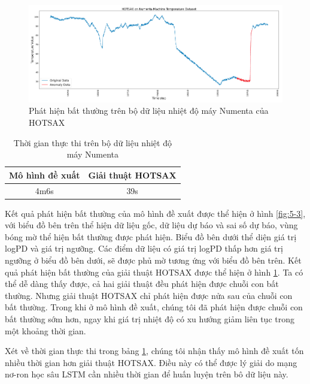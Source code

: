 \begin{figure}[H]
    \centering
    \includegraphics[scale=0.85]{./content/images/5-4.png}
    \caption{Phát hiện bất thường trên bộ dữ liệu nhiệt độ máy Numenta của HOTSAX}
    \label{fig:5-4}
\end{figure}

\begin{table}[H]
\centering
\begin{tabular}{|c|c|}
\hline
\textbf{Mô hình đề xuất} & \textbf{Giải thuật HOTSAX}  \\
\hline
4m6s                       & 39s                     \\
\hline
\end{tabular}
\caption{Thời gian thực thi trên bộ dữ liệu nhiệt độ máy Numenta}
\label{tab:5-2}
\end{table}

Kết quả phát hiện bất thường của mô hình đề xuất được thể hiện ở hình \ref{fig:5-3}, với biểu đồ bên trên thể hiện dữ liệu gốc, dữ liệu dự báo và sai số dự báo, vùng bóng mờ thể hiện bất thường được phát hiện. Biểu đồ bên dưới thể diện giá trị logPD và giá trị ngưỡng. Các điểm dữ liệu có giá trị logPD thấp hơn giá trị ngưỡng ở biểu đồ bên dưới, sẽ được phủ mờ tương ứng với biểu đồ bên trên. Kết quả phát hiện bất thường của giải thuật HOTSAX được thể hiện ở hình \ref{fig:5-4}. Ta có thể dễ dàng thấy được, cả hai giải thuật đều phát hiện được chuỗi con bất thường. Nhưng giải thuật HOTSAX chỉ phát hiện được nửa sau của chuỗi con bất thường. Trong khi ở mô hình đề xuất, chúng tôi đã phát hiện được chuỗi con bất thường sớm hơn, ngay khi giá trị nhiệt độ có xu hướng giảm liên tục trong một khoảng thời gian.

Xét về thời gian thực thi trong bảng \ref{tab:5-2}, chúng tôi nhận thấy mô hình đề xuất tốn nhiều thời gian hơn giải thuật HOTSAX. Điều này có thể được lý giải do mạng nơ-ron học sâu LSTM cần nhiều thời gian để huấn luyện trên bô dữ liệu này.


